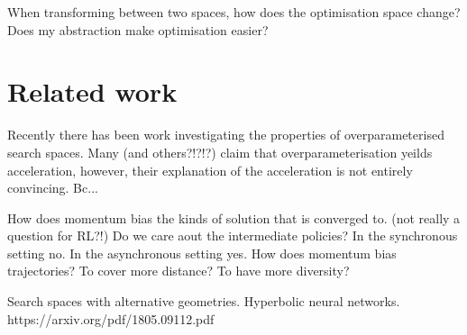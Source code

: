 When transforming between two spaces, how does the optimisation space
change? Does my abstraction make optimisation easier?


\section{Related work}

Recently there has been work investigating the properties of overparameterised search spaces.
Many \cite{Arora2018} (and others?!?!?) claim that overparameterisation yeilds acceleration, however,
their explanation of the acceleration is not entirely convincing. Bc...

How does momentum bias the kinds of solution that is converged to. (not really a question for RL?!)
Do we care aout the intermediate policies? In the synchronous setting no. In the asynchronous setting yes.
How does momentum bias trajectories? To cover more distance? To have more diversity?

Search spaces with alternative geometries.
Hyperbolic neural networks. https://arxiv.org/pdf/1805.09112.pdf
